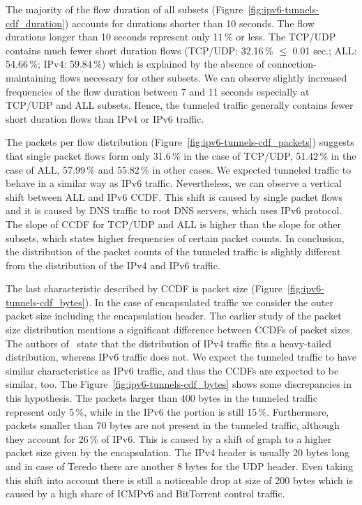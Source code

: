 The majority of the flow duration of all subsets (Figure~\ref{fig:ipv6-tunnels-cdf_duration}) accounts for durations shorter than 10 seconds. The flow durations longer than 10 seconds represent only 11\,\% or less. The TCP/UDP contains much fewer short duration flows (TCP/UDP: 32.16\,\% $\leq$ 0.01 sec.; ALL: 54.66\,\%; IPv4: 59.84\,\%) which is explained by the absence of connection-maintaining flows necessary for other subsets. We can observe slightly increased frequencies of the flow duration between 7 and 11 seconds especially at TCP/UDP and ALL subsets. Hence, the tunneled traffic generally contains fewer short duration flows than IPv4 or IPv6 traffic.

The packets per flow distribution (Figure~\ref{fig:ipv6-tunnels-cdf_packets}) suggests that single packet flows form only 31.6\,\% in the case of TCP/UDP, 51.42\,\% in the case of ALL, 57.99\,\% and 55.82\,\% in other cases. We expected tunneled traffic to behave in a similar way as IPv6 traffic. Nevertheless, we can observe a vertical shift between ALL and IPv6 CCDF. This shift is caused by single packet flows and it is caused by DNS traffic to root DNS servers, which uses IPv6 protocol. The slope of CCDF for TCP/UDP and ALL is higher than the slope for other subsets, which states higher frequencies of certain packet counts. In conclusion, the distribution of the packet counts of the tunneled traffic is slightly different from the distribution of the IPv4 and IPv6 traffic.

The last characteristic described by CCDF is packet size (Figure~\ref{fig:ipv6-tunnels-cdf_bytes}). In the case of encapsulated traffic we consider the outer packet size including the encapsulation header. The earlier study of the packet size distribution mentions a significant difference between CCDFs of packet sizes. The authors of~\cite{Ciflikli-2012-Packet} state that the distribution of IPv4 traffic fits a heavy-tailed distribution, whereas IPv6 traffic does not. We expect the tunneled traffic to have similar characteristics as IPv6 traffic, and thus the CCDFs are expected to be similar, too. The Figure~\ref{fig:ipv6-tunnels-cdf_bytes} shows some discrepancies in this hypothesis. The packets larger than 400 bytes in the tunneled traffic represent only 5\,\%, while in the IPv6 the portion is still 15\,\%. Furthermore, packets smaller than 70 bytes are not present in the tunneled traffic, although they account for 26\,\% of IPv6. This is caused by a shift of graph to a higher packet size given by the encapsulation. The IPv4 header is usually 20 bytes long and in case of Teredo there are another 8 bytes for the UDP header. Even taking this shift into account there is still a noticeable drop at size of 200 bytes which is caused by a high share of ICMPv6 and BitTorrent control traffic.


